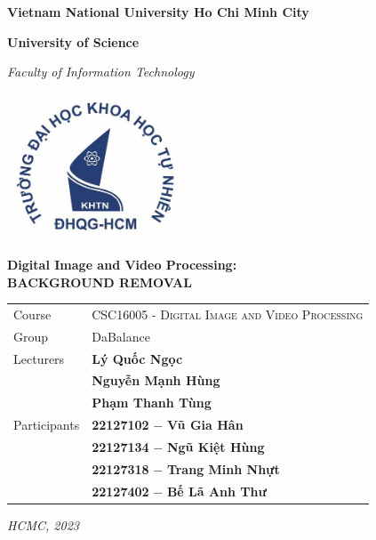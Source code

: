 \documentclass[12pt, a4paper]{extarticle}
\begin{document}
    


    \begin{titlepage}
        \begin{center}
            {
                \Large
                \textbf{Vietnam National University Ho Chi Minh City}
            }

            \vspace{0.5cm}
            {
                \Large
                \textbf{University of Science}
            }

            \vspace{0.5cm}
            {
                \large
                \textit{Faculty of Information Technology}
            }

            \vspace{2cm}
            \includegraphics[width=0.4\textwidth]{hcmus.jpg}

            \vspace{2cm}
            {
                \huge
                \textbf{Digital Image and Video Processing:} \vspace{0.3cm} \\
                \textbf{BACKGROUND REMOVAL}
            }

            \vspace{3cm}
            {

                \begin{tabular}{l l}
                    Course & {\large\textsc{CSC16005 - Digital Image and Video Processing}}\vspace{0.2cm}\\
                    Group & {\large DaBalance}\vspace{0.2cm}\\
                    Lecturers & \textbf{Lý Quốc Ngọc}\\
                     & \textbf{Nguyễn Mạnh Hùng}\\
                     & \textbf{Phạm Thanh Tùng}\vspace{0.2cm}\\
                    Participants 
                    & \textbf{22127102} $-$ \textbf{Vũ Gia Hân}\\
                    & \textbf{22127134} $-$ \textbf{Ngũ Kiệt Hùng} \\
                    & \textbf{22127318} $-$ \textbf{Trang Minh Nhựt} \\
                    & \textbf{22127402} $-$ \textbf{Bế Lã Anh Thư} 
                \end{tabular}
            }
            \vfill
            \vspace{0.5cm}
            {
                \textit{HCMC, 2023}
            }
        \end{center}
    \end{titlepage}
\end{document}
